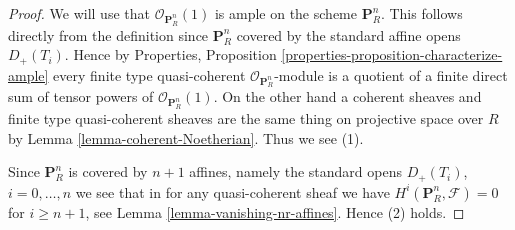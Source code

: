 \begin{proof}
We will use that $\mathcal{O}_{\mathbf{P}^n_R}(1)$ is ample on
the scheme $\mathbf{P}^n_R$. This follows directly from the definition
since $\mathbf{P}^n_R$ covered by the standard affine opens $D_{+}(T_i)$.
Hence by
Properties, Proposition \ref{properties-proposition-characterize-ample}
every finite type quasi-coherent $\mathcal{O}_{\mathbf{P}^n_R}$-module
is a quotient of a finite direct sum of tensor powers of
$\mathcal{O}_{\mathbf{P}^n_R}(1)$. On the other hand a coherent sheaves
and finite type quasi-coherent sheaves are the same thing on projective
space over $R$ by Lemma \ref{lemma-coherent-Noetherian}. Thus we see (1).

\medskip\noindent
Since $\mathbf{P}^n_R$ is covered by $n + 1$ affines, namely the standard
opens $D_{+}(T_i)$, $i = 0, \ldots, n$ we see that in for any quasi-coherent
sheaf we have $H^i(\mathbf{P}^n_R, \mathcal{F}) = 0$ for $i \geq n + 1$,
see Lemma \ref{lemma-vanishing-nr-affines}. Hence (2) holds.



\end{proof}









































